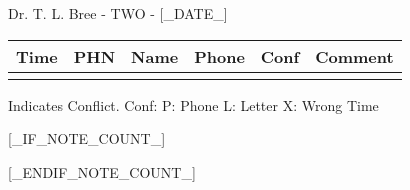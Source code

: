 \documentclass[12pt]{article}
\newenvironment{my_enumerate}{
\begin{enumerate}
  \setlength{\itemsep}{1pt}
  \setlength{\parskip}{0pt}
  \setlength{\parsep}{0pt}}{\end{enumerate}
}
\begin{document}
\begin{center}
{\Large Dr. T. L. Bree - TWO - [_DATE_]} \\[.5pc]
\end{center}


\footnotesize
\vspace{0.12in}

\begin{center}
\begin{tabular}{rllrll}
\textbf{Time} & \textbf{PHN} & \textbf{Name} & \textbf{Phone} & \textbf{Conf} & \textbf{Comment} \\
\midrule
[_CONTENTS_]
\bottomrule
\vspace{-0.40in}
\end{tabular}
\end{center}

\begin{center}
{\scriptsize * Indicates Conflict.  Conf: P: Phone L: Letter X: Wrong Time}
\end{center}


[_IF_NOTE_COUNT_]
\begin{my_enumerate}
[_NOTES_]
\end{my_enumerate}
[_ENDIF_NOTE_COUNT_]
\end{document}

